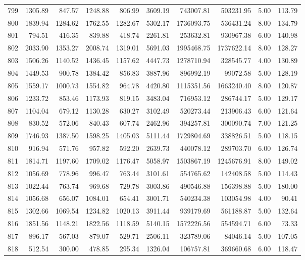 \begin{tabular}{lrrrrrrrrr}
799 & 1305.89 & 847.57 & 1248.88 & 806.99 & 3609.19 & 743007.81 & 503231.95 & 5.00 & 113.79 \\
800 & 1839.94 & 1284.62 & 1762.55 & 1282.67 & 5302.17 & 1736093.75 & 536431.24 & 8.00 & 134.79 \\
801 & 794.51 & 416.35 & 839.88 & 418.74 & 2261.81 & 253632.81 & 930967.38 & 6.00 & 140.98 \\
802 & 2033.90 & 1353.27 & 2008.74 & 1319.01 & 5691.03 & 1995468.75 & 1737622.14 & 8.00 & 128.27 \\
803 & 1506.26 & 1140.52 & 1436.45 & 1157.62 & 4447.73 & 1278710.94 & 328545.77 & 4.00 & 130.89 \\
804 & 1449.53 & 900.78 & 1384.42 & 856.83 & 3887.96 & 896992.19 & 99072.58 & 5.00 & 128.19 \\
805 & 1559.17 & 1000.73 & 1554.82 & 964.78 & 4420.80 & 1115351.56 & 1663240.40 & 8.00 & 120.87 \\
806 & 1233.72 & 853.46 & 1173.93 & 819.15 & 3483.04 & 716953.12 & 286744.17 & 5.00 & 129.17 \\
807 & 1104.04 & 679.12 & 1130.28 & 630.27 & 3102.49 & 520273.44 & 213906.43 & 6.00 & 121.64 \\
808 & 830.52 & 572.06 & 840.43 & 607.74 & 2462.96 & 394257.81 & 300090.74 & 7.00 & 121.25 \\
809 & 1746.93 & 1387.50 & 1598.25 & 1405.03 & 5111.44 & 1729804.69 & 338826.51 & 5.00 & 118.15 \\
810 & 916.94 & 571.76 & 957.82 & 592.20 & 2639.73 & 440078.12 & 289703.70 & 6.00 & 126.74 \\
811 & 1814.71 & 1197.60 & 1709.02 & 1176.47 & 5058.97 & 1503867.19 & 1245676.91 & 8.00 & 149.02 \\
812 & 1056.69 & 778.96 & 996.47 & 763.44 & 3101.61 & 554765.62 & 142408.58 & 5.00 & 114.43 \\
813 & 1022.44 & 763.74 & 969.68 & 729.78 & 3003.86 & 490546.88 & 156398.88 & 5.00 & 180.00 \\
814 & 1056.68 & 656.07 & 1084.01 & 654.41 & 3001.71 & 540234.38 & 103054.98 & 4.00 & 90.41 \\
815 & 1302.66 & 1069.54 & 1234.82 & 1020.13 & 3911.44 & 939179.69 & 561188.87 & 5.00 & 132.64 \\
816 & 1851.56 & 1148.21 & 1822.56 & 1118.59 & 5140.15 & 1572226.56 & 554594.71 & 6.00 & 73.33 \\
817 & 896.17 & 567.03 & 879.07 & 529.71 & 2506.11 & 323789.06 & 84046.14 & 5.00 & 107.05 \\
818 & 512.54 & 300.00 & 478.85 & 295.34 & 1326.04 & 106757.81 & 369660.68 & 6.00 & 118.47 \\

\end{tabular}
